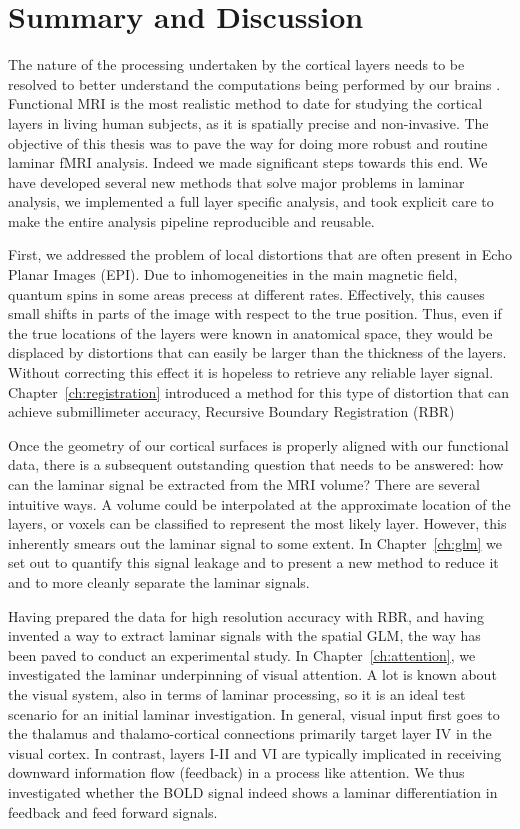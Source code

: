 
\chapter{Summary and Discussion}
\label{ch:discussion}

The nature of the processing undertaken by the cortical layers needs to be resolved to better understand the computations being performed by our brains \cite{Miller2001}. Functional MRI is the most realistic method to date for studying the cortical layers in living human subjects, as it is spatially precise and non-invasive. The objective of this thesis was to pave the way for doing more robust and routine laminar fMRI analysis. Indeed we made significant steps towards this end. We have developed several new methods that solve major problems in laminar analysis, we implemented a full layer specific analysis, and took explicit care to make the entire analysis pipeline reproducible and reusable.

First, we addressed the problem of local distortions that are often present in Echo Planar Images (EPI). Due to inhomogeneities in the main magnetic field, quantum spins in some areas precess at different rates. Effectively, this causes small shifts in parts of the image with respect to the true position. Thus, even if the true locations of the layers were known in anatomical space, they would be displaced by distortions that can easily be larger than the thickness of the layers. Without correcting this effect it is hopeless to retrieve any reliable layer signal. Chapter~\ref{ch:registration} introduced a method for this type of distortion that can achieve submillimeter accuracy, Recursive Boundary Registration (RBR)

Once the geometry of our cortical surfaces is properly aligned with our functional data, there is a subsequent outstanding question that needs to be answered: how can the laminar signal be extracted from the MRI volume? There are several intuitive ways. A volume could be interpolated at the approximate location of the layers, or voxels can be classified to represent the most likely layer. However, this inherently smears out the laminar signal to some extent. In Chapter~\ref{ch:glm} we set out to quantify this signal leakage and to present a new method to reduce it and to more cleanly separate the laminar signals.

Having prepared the data for high resolution accuracy with RBR, and having invented a way to extract laminar signals with the spatial GLM, the way has been paved to conduct an experimental study. In Chapter~\ref{ch:attention}, we investigated the laminar underpinning of visual attention. A lot is known about the visual system, also in terms of laminar processing, so it is an ideal test scenario for an initial laminar investigation. In general, visual input first goes to the thalamus and thalamo-cortical connections primarily target layer IV in the visual cortex. In contrast, layers I-II and VI are typically implicated in receiving downward information flow (feedback) in a process like attention. We thus investigated whether the BOLD signal indeed shows a laminar differentiation in feedback and feed forward signals.

